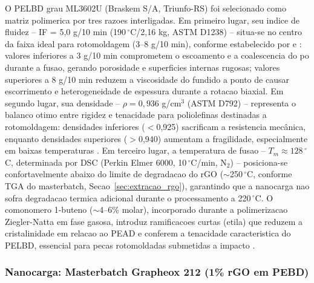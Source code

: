 \documentclass[11pt,a4paper,oneside]{article}
\begin{document}
O PELBD grau ML3602U (Braskem S/A, Triunfo-RS) foi selecionado como matriz polimerica por tres
razoes interligadas. Em primeiro lugar, seu indice de fluidez -- IF = 5,0 g/10 min
(190$\,^{\circ}$C/2,16 kg, ASTM D1238) -- situa-se no centro da faixa ideal para rotomoldagem
(3--8 g/10 min), conforme estabelecido por \citet{Crawford2001} e \citet{Islabao2005}: valores
inferiores a 3 g/10 min comprometem o escoamento e a coalescencia do po durante a fusao,
gerando porosidade e superficies internas rugosas; valores superiores a 8 g/10 min reduzem a
viscosidade do fundido a ponto de causar escorrimento e heterogeneidade de espessura durante a
rotacao biaxial. Em segundo lugar, sua densidade -- $\rho = 0{,}936$ g/cm$^3$ (ASTM D792) --
representa o balanco otimo entre rigidez e tenacidade para poliolefinas destinadas a
rotomoldagem: densidades inferiores ($<$0,925) sacrificam a resistencia mecânica, enquanto
densidades superiores ($>$0,940) aumentam a fragilidade, especialmente em baixas temperaturas
\cite{Coutinho2003}. Em terceiro lugar, a temperatura de fusao -- $T_m \approx 128\,^{\circ}$C,
determinada por DSC (Perkin Elmer 6000, 10$\,^{\circ}$C/min, N$_2$) -- posiciona-se
confortavelmente abaixo do limite de degradacao do rGO (${\sim}$250$\,^{\circ}$C, conforme TGA
do masterbatch, Secao~\ref{sec:extracao_rgo}), garantindo que a nanocarga nao sofra degradacao
termica adicional durante o processamento a 220$\,^{\circ}$C. O comonomero 1-buteno
(${\sim}$4--6\% molar), incorporado durante a polimerizacao Ziegler-Natta em fase gasosa,
introduz ramificacoes curtas (etila) que reduzem a cristalinidade em relacao ao PEAD e conferem
a tenacidade caracteristica do PELBD, essencial para pecas rotomoldadas submetidas a impacto
\cite{Kim2010}.

\subsubsection{Nanocarga: Masterbatch Grapheox 212 (1\% rGO em PEBD)}
\end{document}
